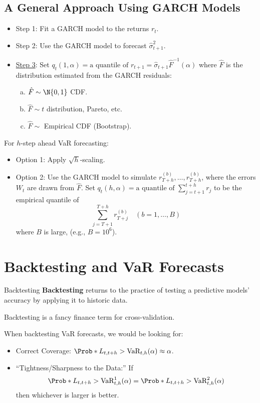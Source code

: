 \subsection*{A General Approach Using GARCH Models}
\begin{itemize}
    \item Step 1: Fit a GARCH model to the returns $ r_t $.
    \item Step 2: Use the GARCH model to forecast $ \hat{\sigma}_{t+1}^2 $.
    \item \underline{Step 3}: Set $ q_t(1,\alpha)=\text{a quantile of $r_{t+1}$}=\hat{\sigma}_{t+1}\hat{F}^{-1}(\alpha) $
          where $ \hat{F} $ is the distribution estimated from the GARCH residuals:
          \begin{enumerate}[(a)]
              \item $ \hat{F}\sim \N{0,1} $ CDF\@.
              \item $ \hat{F}\sim t $ distribution, Pareto, etc.
              \item $ \hat{F}\sim $ Empirical CDF (Bootstrap)\@.
          \end{enumerate}
\end{itemize}
For $ h $-step ahead VaR forecasting:
\begin{itemize}
    \item Option 1: Apply $ \sqrt{h} $-scaling.
    \item Option 2: Use the GARCH model to simulate $ r_{T+h}^{(b)},\ldots,r_{T+h}^{(b)} $,
          where the errors $ W_t $ are drawn from $ \hat{F} $. Set $ q_t(h,\alpha)=\text{a quantile of $\sum_{j=t+1}^{t+h}r_j $}$
          to be the empirical quantile of
          \[ \sum_{j=T+1}^{T+h} r_{T+j}^{(b)}\quad(b=1,\ldots,B) \]
          where $ B $ is large, (e.g., $B=10^{6} $).
\end{itemize}
\section{Backtesting and VaR Forecasts}
\begin{Definition}{Backtesting}{}
    \textbf{Backtesting} returns to the practice of testing a predictive
    models' accuracy by applying it to historic data.
\end{Definition}
\begin{Remark}{}{}
    Backtesting is a fancy finance term for cross-validation.
\end{Remark}
When backtesting VaR forecasts, we would be looking for:
\begin{itemize}
    \item Correct Coverage: $ \Prob*{L_{t,t+h}>\text{VaR}_{t,h}(\alpha)}\approx \alpha $.
    \item ``Tightness/Sharpness to the Data:'' If
          \[ \Prob*{L_{t,t+h}>\text{VaR}^1_{t,h}(\alpha)}=\Prob*{L_{t,t+h}>\text{VaR}^2_{t,h}(\alpha)} \]
          then whichever is larger is better.
\end{itemize}
